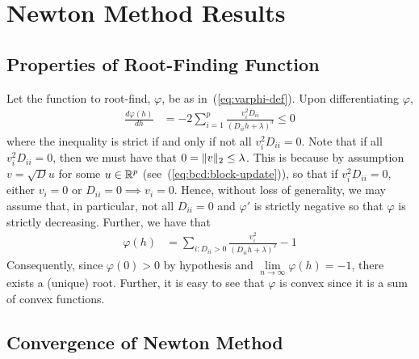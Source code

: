 \appendix

\section{Newton Method Results}\label{appendix:newton}

\subsection{Properties of Root-Finding Function}\label{appendix:properties-varphi}

Let the function to root-find, $\varphi$, be as in~(\ref{eq:varphi-def}).
Upon differentiating $\varphi$,
\begin{align*}
    \frac{d\varphi(h)}{dh}
    &=
    -2 \sum\limits_{i=1}^p
    \frac{v_i^2 D_{ii}}{(D_{ii} h + \lambda)^3}
    \leq
    0
\end{align*}
where the inequality is strict if and only if not all $v_i^2 D_{ii} = 0$.
Note that if all $v_i^2 D_{ii} = 0$, then we must have that $0 = \|v\|_2 \leq \lambda$.
This is because by assumption $v = \sqrt{D} u$ for some $u \in \mathbb{R}^p$
(see~(\ref{eq:bcd:block-update})), so that 
if $v_i^2 D_{ii} = 0$, either $v_i = 0$ or $D_{ii} = 0 \implies v_i = 0$.
Hence, without loss of generality, we may assume 
that, in particular, not all $D_{ii} = 0$ and
$\varphi'$ is strictly negative so that $\varphi$ is strictly decreasing.
Further, we have that
\begin{align*}
    \varphi(h)
    &=
    \sum\limits_{i: D_{ii} > 0}
    \frac{v_i^2}{(D_{ii} h + \lambda)^2} - 1
\end{align*}
Consequently, since $\varphi(0) > 0$ by hypothesis and
$\lim\limits_{n\to\infty} \varphi(h) = -1$,
there exists a (unique) root.
Further, it is easy to see that $\varphi$ is convex since it is a 
sum of convex functions.

\subsection{Convergence of Newton Method}\label{appendix:newton-convergence}

